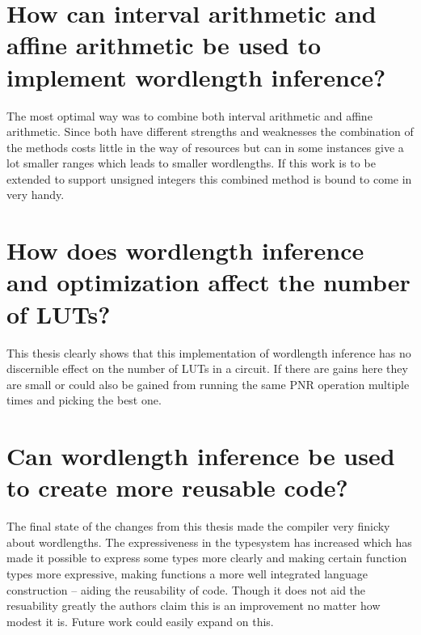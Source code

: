 \section{How can interval arithmetic and affine arithmetic be used to implement wordlength inference?}
The most optimal way was to combine both interval arithmetic and affine arithmetic. Since both have different strengths and weaknesses the combination of the methods costs little in the way of resources but can in some instances give a lot smaller ranges which leads to smaller wordlengths. If this work is to be extended to support unsigned integers this combined method is bound to come in very handy. 

\section{How does wordlength inference and optimization affect the number of LUTs?}
This thesis clearly shows that this implementation of wordlength inference has no discernible effect on the number of LUTs in a circuit. If there are gains here they are small or could also be gained from running the same PNR operation multiple times and picking the best one.

\section{Can wordlength inference be used to create more reusable code?}
The final state of the changes from this thesis made the compiler very finicky about wordlengths. The expressiveness in the typesystem has increased which has made it possible to express some types more clearly and making certain function types more expressive, making functions a more well integrated language construction -- aiding the reusability of code. Though it does not aid the resuability greatly the authors claim this is an improvement no matter how modest it is. Future work could easily expand on this.


